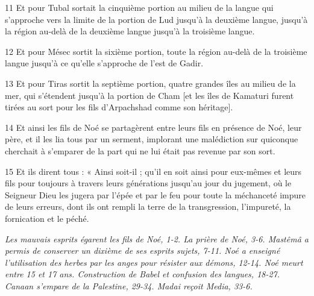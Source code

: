 \par 11 Et pour Tubal sortait la cinquième portion au milieu de la langue qui s'approche vers la limite de la portion de Lud jusqu'à la deuxième langue, jusqu'à la région au-delà de la deuxième langue jusqu'à la troisième langue.
\par 12 Et pour Mésec sortit la sixième portion, toute la région au-delà de la troisième langue jusqu'à ce qu'elle s'approche de l'est de Gadir.
\par 13 Et pour Tiras sortit la septième portion, quatre grandes îles au milieu de la mer, qui s'étendent jusqu'à la portion de Cham [et les îles de Kamaturi furent tirées au sort pour les fils d'Arpachshad comme son héritage].
\par 14 Et ainsi les fils de Noé se partagèrent entre leurs fils en présence de Noé, leur père, et il les lia tous par un serment, implorant une malédiction sur quiconque cherchait à s'emparer de la part qui ne lui était pas revenue par son sort.
\par 15 Et ils dirent tous : « Ainsi soit-il ; qu'il en soit ainsi pour eux-mêmes et leurs fils pour toujours à travers leurs générations jusqu'au jour du jugement, où le Seigneur Dieu les jugera par l'épée et par le feu pour toute la méchanceté impure de leurs erreurs, dont ils ont rempli la terre de la transgression, l'impureté, la fornication et le péché.


\par \textit{Les mauvais esprits égarent les fils de Noé, 1-2. La prière de Noé, 3-6. Mastêmâ a permis de conserver un dixième de ses esprits sujets, 7-11. Noé a enseigné l'utilisation des herbes par les anges pour résister aux démons, 12-14. Noé meurt entre 15 et 17 ans. Construction de Babel et confusion des langues, 18-27. Canaan s'empare de la Palestine, 29-34. Madai reçoit Media, 33-6.}

